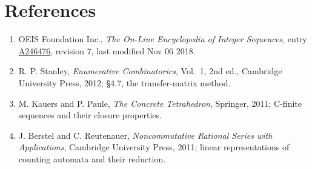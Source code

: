 \documentclass[11pt]{article}
\theoremstyle{definition}
\begin{document}
\section{References}

\begin{enumerate}

\item OEIS Foundation Inc., \emph{The On-Line Encyclopedia of Integer Sequences}, entry \href{https://oeis.org/A246476}{A246476}, revision 7, last modified Nov 06 2018.

\item R. P. Stanley, \emph{Enumerative Combinatorics}, Vol.~1, 2nd ed., Cambridge University Press, 2012; \S4.7, the transfer-matrix method.

\item M. Kauers and P. Paule, \emph{The Concrete Tetrahedron}, Springer, 2011; C-finite sequences and their closure properties.

\item J. Berstel and C. Reutenauer, \emph{Noncommutative Rational Series with Applications}, Cambridge University Press, 2011; linear representations of counting automata and their reduction.

\end{enumerate}
\end{document}
